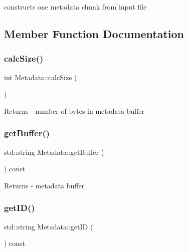 constructs one metadata chunk from input file 

\subsection{Member Function Documentation}
\mbox{\label{classMetadata_a039be0a66dabf1ea223790066ab6d430}} 
\subsubsection{\texorpdfstring{calc\+Size()}{calcSize()}}
{\footnotesize\ttfamily int Metadata\+::calc\+Size (\begin{DoxyParamCaption}{ }\end{DoxyParamCaption})}

\begin{DoxyReturn}{Returns}
-\/ number of bytes in metadata buffer 
\end{DoxyReturn}
\mbox{\label{classMetadata_a59e34c51d464ab8e123e28abf8ef2e67}} 
\subsubsection{\texorpdfstring{get\+Buffer()}{getBuffer()}}
{\footnotesize\ttfamily std\+::string Metadata\+::get\+Buffer (\begin{DoxyParamCaption}{ }\end{DoxyParamCaption}) const}

\begin{DoxyReturn}{Returns}
-\/ metadata buffer 
\end{DoxyReturn}
\mbox{\label{classMetadata_a3567498d73b473be0b3d6ba505067f9c}} 
\subsubsection{\texorpdfstring{get\+I\+D()}{getID()}}
{\footnotesize\ttfamily std\+::string Metadata\+::get\+ID (\begin{DoxyParamCaption}{ }\end{DoxyParamCaption}) const}

